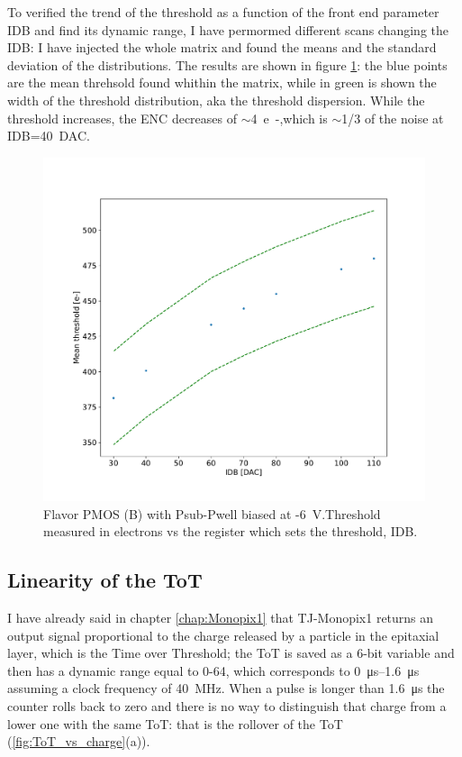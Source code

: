         To verified the trend of the threshold as a function of the front end parameter IDB and find its dynamic range, I have permormed different scans changing the IDB: I have injected the whole matrix and found the means and the standard deviation of the distributions. The results are shown in figure \ref{fig:threshold_vs_IDB}: the blue points are the mean threhsold found whithin the matrix, while in green is shown the width of the threshold distribution, aka the threshold dispersion. 
        While the threshold increases, the ENC decreases of $\sim$\SI{4}{e-},which is $\sim$1/3 of the noise at IDB=\SI{40}{DAC}. 
        \begin{figure}[h!]
            \centering
            \includegraphics[width=.70\linewidth]{figures/charaterization/thr_vs_IDB.pdf}
            \caption{Flavor PMOS (B) with Psub-Pwell biased at -\SI{6}{V}.Threshold measured in electrons vs the register which sets the threshold, IDB.  }
            \label{fig:threshold_vs_IDB}
        \end{figure}            


    \subsection{Linearity of the ToT}    
        I have already said in chapter \ref{chap:Monopix1} that TJ-Monopix1 returns an output signal proportional to the charge released by a particle in the epitaxial layer, which is the Time over Threshold; the ToT is saved as a 6-bit variable and then has a dynamic range equal to 0-64, which corresponds to \SIrange{0}{1.6}{\us} assuming a clock frequency of \SI{40}{MHz}.
        When a pulse is longer than \SI{1.6}{\us} the counter rolls back to zero and there is no way to distinguish that charge from a lower one with the same ToT: that is the rollover of the ToT (\ref{fig:ToT_vs_charge}(a)).   

